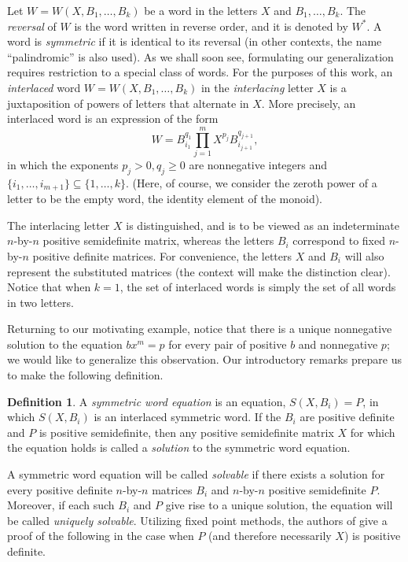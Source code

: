 \documentclass{amsart}
\theoremstyle{definition}
\newtheorem{defn}[thm]{Definition}
\theoremstyle{remark}
\numberwithin{equation}{section}
\newcommand{\<}{\langle}
\renewcommand{\>}{\rangle}
\begin{document}
Let $W = W(X,B_1,\ldots,B_k)$ be a word in
the letters $X$ and $B_1,\ldots,B_k$.  The {\it reversal} of $W$ is the word written in reverse order, and it is denoted by $W^{*}$.  A word is {\it symmetric} if it is identical to its reversal
(in other contexts, the name ``palindromic'' is also used).   As we shall soon see, formulating our generalization requires restriction to a special class of words.  For the purposes of this work, an {\it interlaced} word $W = W(X,B_1,\ldots,B_k)$ in the \textit{interlacing} letter $X$ is a juxtaposition of powers of letters that alternate in $X$.  More precisely, an interlaced word is an expression of the form 
\begin{equation}\label{interlacedef}
W = B_{i_1}^{q_1}\prod_{j=1}^{m} {X^{p_j}B_{i_{j+1}}^{q_{j+1}}},
\end{equation}
in which the exponents $p_{j} > 0, q_j \geq 0$ are nonnegative integers and $\{i_1,\ldots,i_{m+1} \} \subseteq \{1,\ldots,k\}$.   (Here, of course, we consider the zeroth power of a letter to be the empty word, the identity element of the monoid).

The interlacing letter $X$ is distinguished, and is to be viewed as an indeterminate $n$-by-$n$ positive semidefinite matrix, whereas the letters $B_i$ correspond to fixed $n$-by-$n$ positive definite matrices.   For convenience, the letters $X$ and $B_i$ will also represent the substituted matrices (the context will make the distinction clear).  Notice that when $k = 1$, the set of interlaced words is simply the set of all words in two letters.

Returning to our motivating example, notice that there is a unique nonnegative solution to the equation $bx^m = p$ for every pair of positive $b$ and nonnegative $p$;  we would like to generalize this observation.  Our introductory remarks prepare us to make the following definition.

\begin{defn}\label{symmwordeqdef}
A {\it symmetric word equation} is an equation, $S(X,B_i) = P$, in
which $S(X,B_i)$ is an interlaced symmetric word. If the $B_i$ are positive definite and $P$ is positive semidefinite, then any positive semidefinite matrix $X$ for which the equation holds is called a {\it solution} to the
symmetric word equation.
\end{defn}

A symmetric word equation will be called {\it solvable} if there
exists a solution for every positive definite $n$-by-$n$ matrices $B_i$ and $n$-by-$n$ positive semidefinite $P$. Moreover, if each such $B_i$ and $P$ give rise to a unique solution, the equation will be called {\it uniquely solvable}.  Utilizing fixed point methods, the authors of \cite{JH2} give a proof of the following \cite[Theorem 7.1]{JH2} in the case when $P$ (and therefore necessarily $X$) is positive definite.
\end{document}
